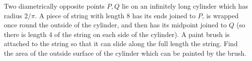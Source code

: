 Two diametrically opposite points $P, Q$ lie on an infinitely long cylinder
which has radius $2/\pi$. A piece of string with length 8 has its ends joined
to $P$, is wrapped once round the outside of the cylinder, and then has its
midpoint joined to $Q$ (so there is length 4 of the string on each side of the
cylinder). A paint brush is attached to the string so that it can slide along
the full length the string. Find the area of the outside surface of the
cylinder which can be painted by the brush.

